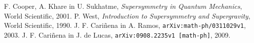 \documentclass[a4paper, 12pt]{article}
\begin{document}


\tableofcontents

\pagebreak















\begin{thebibliography}{9}
	F. Cooper, A. Khare in U. Sukhatme,
	\emph{Supersymmetry in Quantum Mechanics},
	World Scientific, 2001.
	P. West,
	\emph{Introduction to Supersymmetry and Supergravity},
	World Scientific, 1990.
	J. F. Cariñena in A. Ramos,
	\texttt{arXiv:math-ph/0311029v1},
	2003.
	J. F. Cariñena in J. de Lucas,
	\texttt{arXiv:0908.2235v1 [math-ph]},
	2009.
\end{thebibliography}
\end{document}
